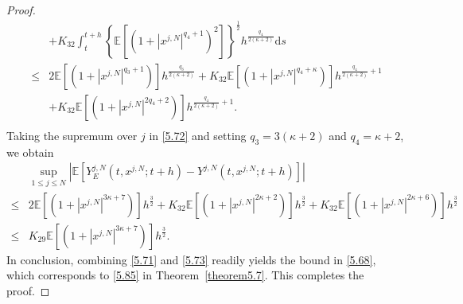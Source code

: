 \documentclass[12pt]{article}
\numberwithin{equation}{section}
\begin{document}
\begin{proof}
\begin{equation}
\begin{aligned}
&+K_{32} \int_t^{t+h}\left\{\mathbb{E}\left[\left(1+\left|x^{j,N}\right|^{q_{4}+1}\right)^2\right]\right\}^{\frac{1}{2}}h^{\frac{q_{4}}{2\left(\kappa+2\right)}}\mathrm{d} s\\
\leq&2\mathbb{E}\left[\left(1+\left|x^{j,N}\right|^{q_{3}+1}\right)\right] h^{\frac{q_{3}}{2\left(\kappa+2\right)}}+K_{32}\mathbb{E}\left[\left(1+\left|x^{j,N}\right|^{q_{4}+\kappa}\right)\right]h^{\frac{q_{4}}{2\left(\kappa+2\right)}+1}\\
&+K_{32} \mathbb{E}\left[\left(1+\left|x^{j,N}\right|^{2q_{4}+2}\right)\right]h^{\frac{q_{4}}{2\left(\kappa+2\right)}+1}.\\
\end{aligned}
\end{equation}
Taking the supremum over $ j $ in \eqref{5.72} and setting $ q_3 = 3\left(\kappa + 2\right) $ and $ q_4 = \kappa + 2 $, we obtain
\begin{equation}\tag{5.101}\label{5.73}
\begin{aligned}
& \underset{1\leqslant j\leqslant N}{\sup}\left|\mathbb{E}\left[Y^{j,N}_{E}\left(t, x^{j,N} ; t+h\right)-Y^{j,N}\left(t, x^{j,N} ; t+h\right)\right]\right| \\
\leq& 2\mathbb{E}\left[\left(1+\left|x^{j,N}\right|^{3\kappa+7}\right)\right] h^{\frac{3}{2}}+K_{32}\mathbb{E}\left[\left(1+\left|x^{j,N}\right|^{2\kappa+2}\right)\right]h^{\frac{3}{2}}+K_{32}\mathbb{E}\left[\left(1+\left|x^{j,N}\right|^{2\kappa+6}\right)\right]h^{\frac{3}{2}} \\
 \leq& K_{29}\mathbb{E}\left[\left(1+\left|x^{j,N}\right|^{3 \kappa+7}\right)\right] h^{\frac{3}{2}}.
\end{aligned}
\end{equation}
In conclusion, combining \eqref{5.71} and \eqref{5.73} readily yields the bound in \eqref{5.68}, which corresponds to \eqref{5.85} in Theorem~\ref{theorem5.7}. 
This completes the proof.
\end{proof} 
\end{document}
